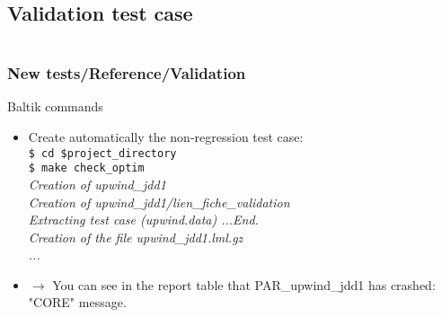 \documentclass[10pt, hyperref={unicode=true,pdfusetitle, bookmarks=true,bookmarksnumbered=false,bookmarksopen=false, breaklinks=false,pdfborder={0 0 1},backref=true,colorlinks=true,linkcolor=darkblue,pageanchor, urlcolor=darkblue}]{beamer}
\begin{document}
\subsection{{\bf{Validation test case}}}
\begin{frame}
\begin{columns}[c] 
\tableofcontents[sections={1-4},currentsection, currentsubsection]
\tableofcontents[sections={5-8},currentsection, currentsubsection]
\end{columns}
\end{frame}
\begin{frame}
\frametitle{New tests/Reference/Validation}
\begin{block}{Baltik commands}

\begin{itemize}
\item Create automatically the non-regression test case:\\
\texttt{\$ cd \$project\_directory}\\
\texttt{\$ make check\_optim}\\
\textit{\hspace{0.1cm} Creation of upwind\_jdd1}\\
\textit{\hspace{0.1cm} Creation of upwind\_jdd1/lien\_fiche\_validation}\\
\textit{\hspace{0.1cm} Extracting test case (upwind.data) ...End.}\\
\textit{\hspace{0.1cm} Creation of the file upwind\_jdd1.lml.gz}\\
\textit{\hspace{0.1cm} ...}\\
\item $\rightarrow$ You can see in the report table that PAR\_upwind\_jdd1 has crashed: "CORE" message.\\
\end{itemize}

\end{block}
\end{frame}
\end{document}
